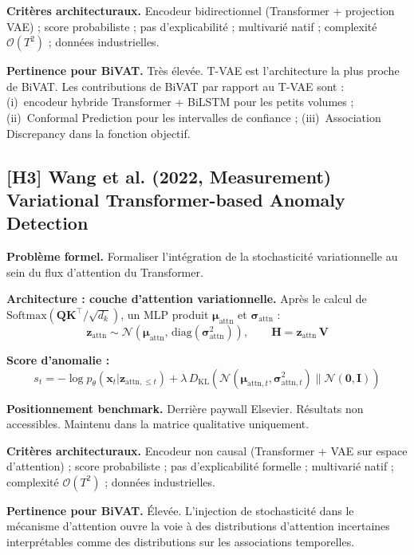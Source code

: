 \documentclass[12pt,a4paper]{article}
\begin{document}
\textbf{Critères architecturaux.} Encodeur bidirectionnel (Transformer +
projection VAE) ; score probabiliste ; pas d'explicabilité ; multivarié natif ;
complexité $\mathcal{O}(T^2)$ ; données industrielles.

\textbf{Pertinence pour BiVAT.} Très élevée. T-VAE est l'architecture la plus
proche de BiVAT. Les contributions de BiVAT par rapport au T-VAE sont :
(i)~encodeur hybride Transformer + BiLSTM pour les petits volumes ; (ii)~Conformal
Prediction pour les intervalles de confiance ; (iii)~Association Discrepancy
dans la fonction objectif.

\subsection{[H3] Wang et al. (2022, Measurement) 
Variational Transformer-based Anomaly Detection}

\textbf{Problème formel.} Formaliser l'intégration de la stochasticité
variationnelle au sein du flux d'attention du Transformer.

\textbf{Architecture : couche d'attention variationnelle.} Après le calcul de
$\mathrm{Softmax}(\mathbf{QK}^\top/\sqrt{d_k})$, un MLP produit
$\boldsymbol{\mu}_{\mathrm{attn}}$ et $\boldsymbol{\sigma}_{\mathrm{attn}}$ :
$$\mathbf{z}_{\mathrm{attn}} \sim \mathcal{N}(\boldsymbol{\mu}_{\mathrm{attn}},
\,\mathrm{diag}(\boldsymbol{\sigma}^2_{\mathrm{attn}})), \qquad
\mathbf{H} = \mathbf{z}_{\mathrm{attn}}\,\mathbf{V}$$

\textbf{Score d'anomalie :}
$$s_t = -\log p_\theta(\mathbf{x}_t|\mathbf{z}_{\mathrm{attn},\leq t})
+ \lambda\,D_{\mathrm{KL}}(\mathcal{N}(\boldsymbol{\mu}_{\mathrm{attn},t},
\boldsymbol{\sigma}^2_{\mathrm{attn},t})\|\mathcal{N}(\mathbf{0},\mathbf{I}))$$

\textbf{Positionnement benchmark.} Derrière paywall Elsevier. Résultats non
accessibles. Maintenu dans la matrice qualitative uniquement.

\textbf{Critères architecturaux.} Encodeur non causal (Transformer + VAE sur
espace d'attention) ; score probabiliste ; pas d'explicabilité formelle ;
multivarié natif ; complexité $\mathcal{O}(T^2)$ ; données industrielles.

\textbf{Pertinence pour BiVAT.} Élevée. L'injection de stochasticité dans
le mécanisme d'attention ouvre la voie à des distributions d'attention
incertaines interprétables comme des distributions sur les associations
temporelles.
\end{document}
